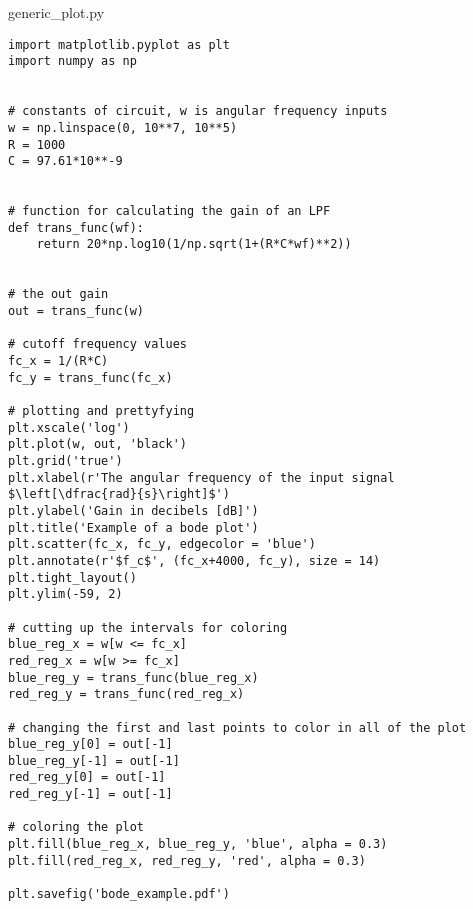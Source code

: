 \lstlistingname{ generic\_plot.py}
\begin{lstlisting}[breaklines]
import matplotlib.pyplot as plt
import numpy as np


# constants of circuit, w is angular frequency inputs
w = np.linspace(0, 10**7, 10**5)
R = 1000
C = 97.61*10**-9


# function for calculating the gain of an LPF
def trans_func(wf):
    return 20*np.log10(1/np.sqrt(1+(R*C*wf)**2))


# the out gain
out = trans_func(w)

# cutoff frequency values
fc_x = 1/(R*C)
fc_y = trans_func(fc_x)

# plotting and prettyfying
plt.xscale('log')
plt.plot(w, out, 'black')
plt.grid('true')
plt.xlabel(r'The angular frequency of the input signal $\left[\dfrac{rad}{s}\right]$')
plt.ylabel('Gain in decibels [dB]')
plt.title('Example of a bode plot')
plt.scatter(fc_x, fc_y, edgecolor = 'blue')
plt.annotate(r'$f_c$', (fc_x+4000, fc_y), size = 14)
plt.tight_layout()
plt.ylim(-59, 2)

# cutting up the intervals for coloring
blue_reg_x = w[w <= fc_x]
red_reg_x = w[w >= fc_x]
blue_reg_y = trans_func(blue_reg_x)
red_reg_y = trans_func(red_reg_x)

# changing the first and last points to color in all of the plot
blue_reg_y[0] = out[-1]
blue_reg_y[-1] = out[-1]
red_reg_y[0] = out[-1]
red_reg_y[-1] = out[-1]

# coloring the plot
plt.fill(blue_reg_x, blue_reg_y, 'blue', alpha = 0.3)
plt.fill(red_reg_x, red_reg_y, 'red', alpha = 0.3)

plt.savefig('bode_example.pdf')

\end{lstlisting}
